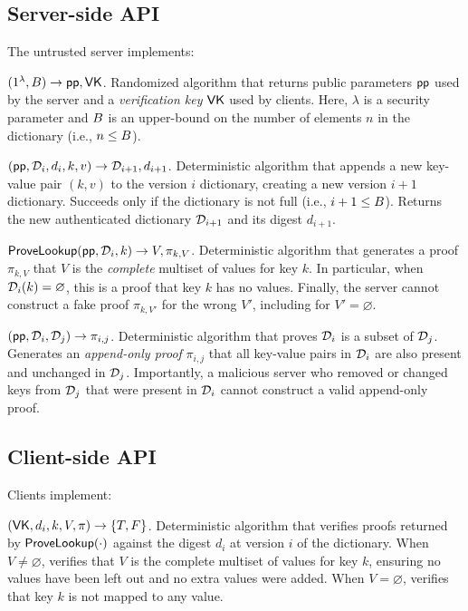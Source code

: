 \subsection{Server-side API}
The untrusted server implements:
\vspace{1em}

\api {\setup}$(1^\lambda, B) \rightarrow \mathsf{pp}, \mathsf{VK}$.
Randomized algorithm that returns public parameters $\mathsf{pp}$ used by the server and a \textit{verification key} $\mathsf{VK}$ used by clients.
Here, $\lambda$ is a security parameter and $B$ is an upper-bound on the number of elements $n$ in the dictionary (i.e., $n \le B$).

\api {\append}$(\mathsf{pp}, \mathcal{D}_i, d_i, k,v) \rightarrow \mathcal{D}_{i+1}, d_{i+1}$.
Deterministic algorithm that appends a new key-value pair $(k,v)$ to the version $i$ dictionary, creating a new version $i+1$ dictionary.
Succeeds only if the dictionary is not full (i.e., $i + 1 \le B$).
Returns the new authenticated dictionary $\mathcal{D}_{i+1}$ and its digest $d_{i+1}$.

\api $\mathsf{ProveLookup}(\mathsf{pp}, \mathcal{D}_i, k) \rightarrow V, \pi_{k,V}$.
Deterministic algorithm that generates a proof $\pi_{k,V}$ that $V$ is the \textit{complete} multiset of values for key $k$.
In particular, when $\mathcal{D}_i(k) = \varnothing$, this is a proof that key $k$ has no values.
Finally, the server cannot construct a fake proof $\pi_{k,V'}$ for the wrong $V'$, including for $V' = \varnothing$.

\api {\proveappendonly}$(\mathsf{pp}, \mathcal{D}_i, \mathcal{D}_j) \rightarrow \pi_{i, j}$.
Deterministic algorithm that proves $\mathcal{D}_i$ is a subset of $\mathcal{D}_j$.
Generates an \textit{append-only proof} $\pi_{i, j}$ that all key-value pairs in $\mathcal{D}_i$ are also present and unchanged in $\mathcal{D}_j$.
Importantly, a malicious server who removed or changed keys from $\mathcal{D}_j$ that were present in $\mathcal{D}_i$ cannot construct a valid append-only proof.

\subsection{Client-side API}
Clients implement:
\vspace{1em}

\api {\verlookup}$(\mathsf{VK}, d_i, k, V, \pi) \rightarrow \{T, F\}$.
Deterministic algorithm that verifies proofs returned by $\mathsf{ProveLookup}(\cdot)$ against the digest $d_i$ at version $i$ of the dictionary.
When $V \ne \varnothing$, verifies that $V$ is the complete multiset of values for key $k$, ensuring no values have been left out and no extra values were added.
When $V = \varnothing$, verifies that key $k$ is not mapped to any value.

